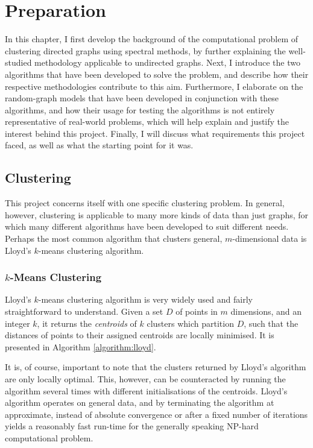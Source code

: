 \chapter{Preparation}

In this chapter, I first develop the background of the computational problem of clustering 
directed graphs using spectral methods, by further explaining the well-studied methodology 
applicable to undirected graphs. Next, I introduce the two algorithms that have been developed to 
solve the problem, and describe how their respective methodologies contribute to this aim. 
Furthermore, I elaborate on the random-graph models that have been developed in conjunction with 
these algorithms, and how their usage for testing the algorithms is not entirely representative of 
real-world problems, which will help explain and justify the interest behind this project. Finally, 
I will discuss what requirements this project faced, as well as what the starting point for it 
was.

\section{Clustering}

This project concerns itself with one specific clustering problem. In general, however, clustering
is applicable to many more kinds of data than just graphs, for which many different algorithms have 
been developed to suit different needs. Perhaps the most common algorithm that clusters general, 
$m$-dimensional data is Lloyd's $k$-means clustering algorithm.

\subsection{$k$-Means Clustering}
Lloyd's $k$-means clustering algorithm is very widely used and fairly straightforward to 
understand. Given a set $D$ of points in $m$ dimensions, and an integer $k$, it returns the 
\emph{centroids} of $k$ clusters which partition $D$, such that the distances of points to their 
assigned centroids are locally minimised. It is presented in Algorithm \ref{algorithm:lloyd}.

It is, of course, important to note that the clusters returned by Lloyd's algorithm are only 
locally optimal. This, however, can be counteracted by running the algorithm several times with 
different initialisations of the centroids. Lloyd's algorithm operates on general data, and by 
terminating the algorithm at approximate, instead of absolute convergence or after a fixed number 
of iterations yields a reasonably fast run-time for the generally speaking NP-hard computational 
problem. 

